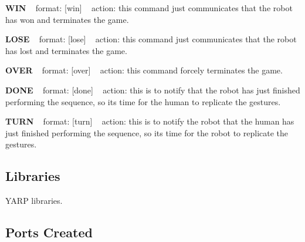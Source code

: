 {\bfseries W\+IN} ~\newline
format\+: \mbox{[}win\mbox{]} ~\newline
action\+: this command just communicates that the robot has won and terminates the game.

{\bfseries L\+O\+SE} ~\newline
format\+: \mbox{[}lose\mbox{]} ~\newline
action\+: this command just communicates that the robot has lost and terminates the game.

{\bfseries O\+V\+ER} ~\newline
format\+: \mbox{[}over\mbox{]} ~\newline
action\+: this command forcely terminates the game.

{\bfseries D\+O\+NE} ~\newline
format\+: \mbox{[}done\mbox{]} ~\newline
action\+: this is to notify that the robot has just finished performing the sequence, so it\textquotesingle{}s time for the human to replicate the gestures.

{\bfseries T\+U\+RN} ~\newline
format\+: \mbox{[}turn\mbox{]} ~\newline
action\+: this is to notify the robot that the human has just finished performing the sequence, so it\textquotesingle{}s time for the robot to replicate the gestures.\hypertarget{group__gestureRecognitionStereo_lib_sec}{}\subsection{Libraries}\label{group__gestureRecognitionStereo_lib_sec}

\begin{DoxyItemize}
\item Y\+A\+RP libraries.
\end{DoxyItemize}\hypertarget{group__gestureRecognitionStereo_portsc_sec}{}\subsection{Ports Created}\label{group__gestureRecognitionStereo_portsc_sec}

